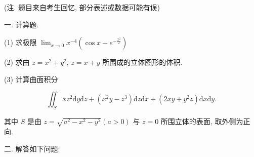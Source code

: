 \documentclass{examcollection}
\renewcommand{\displayformula}[1]{\[#1\]}
\begin{document}
{\begin{minipage}{\textwidth}
\smallskip
(注. 题目来自考生回忆, 部分表述或数据可能有误)\par
一. 计算题.\par
(1) 求极限  $\lim_{x\to0}x^{-4}\left(\cos x-e^{-\frac{x^{2}}{2}}\right)$\par
(2) 求由 $z = x^{2} + y^{2}$, $z = x + y$ 所围成的立体图形的体积.\par
(3) 计算曲面积分\par
\displayformula{\iint_ {S} x z ^ {2} \mathrm{d} y \mathrm{d} z + (x ^ {2} y - z ^ {3}) \mathrm{d} z \mathrm{d} x + (2 x y + y ^ {2} z) \mathrm{d} x \mathrm{d} y.}\par
其中 $S$ 是由 $z = \sqrt{a^2 - x^2 - y^2} (a > 0)$ 与 $z = 0$ 所围立体的表面, 取外侧为正向.\par
二. 解答如下问题:\par
\end{minipage}}
\ifdim\dimexpr\ht\proofbox+\dp\proofbox\relax>\textheight
\noindent\resizebox{!}{\textheight}{\usebox{\proofbox}}\else\noindent\usebox{\proofbox}\fi\clearpage
\end{document}
